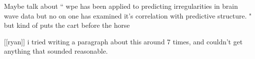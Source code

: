 {\color{red}
Maybe talk about ``
wpe has been applied to predicting irregularities in brain wave data but no on one has examined it's correlation with predictive structure. "
but kind of puts the cart before the horse

[[ryan]] i tried writing a paragraph about this around 7 times, and couldn't get anything that sounded reasonable.
}

